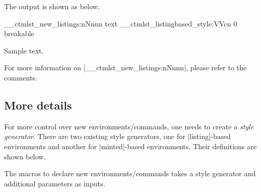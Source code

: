 \documentclass[letterpaper, 11pt, DIV=11]{scrartcl}
\begin{document}
The output is shown as below.

\newcommand{\tcbtextfont}{\fontfamily{lmr}\fontsize{10}{10}}
\ExplSyntaxOn
\__ctmlst_new_listings:nNnnn {text} {\__ctmlst_listingbased_style:VVcn} {0} {breakable} {}
\ExplSyntaxOff

\begin{tcbtext}
Sample text.
\end{tcbtext}

For more information on \rawinline|\__ctmlst_new_listings:nNnnn|, please refer to the comments.

\subsection{More details}

For more control over new environments/commands, one needs to create a \emph{style generator}. There are two existing style generators, one for \rawinline|listing|-based environments and another for \rawinline|minted|-based environments. Their definitions are shown below. 


The macros to declare new environments/commands takes a style generator and additional parameters as inputs.
\end{document}
